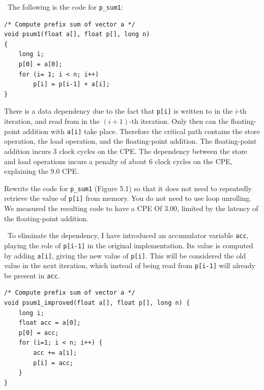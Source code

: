 \documentclass[12pt]{article}
\newenvironment{ex}[2][Exercise]{\begin{trivlist}
		\item[\hskip \labelsep {\bfseries #1}\hskip \labelsep {\bfseries #2.}]}{\end{trivlist}}
\newenvironment{sol}[1][Solution]{\begin{trivlist}
		\item[\hskip \labelsep {\bfseries #1:}]}{\end{trivlist}}
\begin{document}
\begin{sol}
	\
	The following is the code for \texttt{p\_sum1}:
	\begin{lstlisting}
/* Compute prefix sum of vector a */
void psum1(float a[], float p[], long n)
{
	long i;
	p[0] = a[0];
	for (i= 1; i < n; i++)
		p[i] = p[i-1] + a[i];
}
	\end{lstlisting}
	There is a data dependency due to the fact that \texttt{p[i]} is written to in the $i$-th
	iteration, and read from in the $(i+1)$-th iteration. Only then can the floating-point
	addition with \texttt{a[i]} take place. Therefore the critical path contains the
	store operation, the load operation, and the floating-point addition. The floating-point
	addition incurs 3 clock cycles on the CPE. The dependency between the store and load
	operations incurs a penalty of about 6 clock cycles on the CPE, explaining the 9.0
	CPE.
\end{sol}

\begin{ex}{5.12}
	Rewrite the code for \texttt{p\_sum1} (Figure 5.1) so that it does not need to
	repeatedly retrieve the value of \texttt{p[i]} from memory. You do not need to use
	loop unrolling. We measured the resulting code to have a CPE Of 3.00, limited by the
	latency of the floating-point addition.
\end{ex}

\begin{sol}
	\
	To eliminate the dependency, I have introduced an accumulator variable \texttt{acc},
	playing the role of \texttt{p[i-1]} in the original implementation. Its value is computed
	by adding \texttt{a[i]}, giving the new value of \texttt{p[i]}. This will be considered
	the old value in the next iteration, which instead of being read from \texttt{p[i-1]}
	will already be present in \texttt{acc}.
	\begin{lstlisting}
/* Compute prefix sum of vector a */
void psum1_improved(float a[], float p[], long n) {
	long i;
	float acc = a[0];
	p[0] = acc;
	for (i=1; i < n; i++) {
		acc += a[i];
		p[i] = acc;
	}
}
	\end{lstlisting}
\end{sol}
\end{document}

